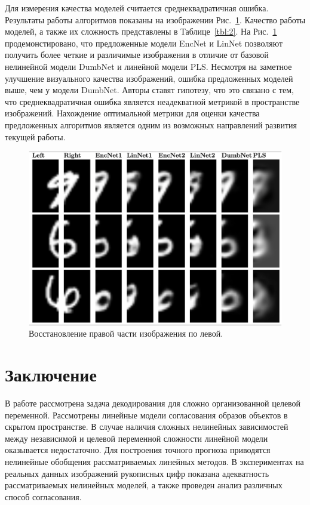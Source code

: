 \documentclass[12pt]{article}
\begin{document}
	Для измерения качества моделей считается среднеквадратичная ошибка. Результаты работы алгоритмов показаны на изображении Рис.~\ref{fgr:2}. Качество работы моделей, а также их сложность представлены в Таблице~\ref{tbl:2}. 
	На Рис.~\ref{fgr:2} продемонстировано, что предложенные модели EncNet и LinNet позволяют получить более четкие и различимые изображения в отличие от базовой нелинейной модели DumbNet и линейной модели PLS.
	Несмотря на заметное улучшение визуального качества изображений, ошибка предложенных моделей выше, чем у модели DumbNet. 
	Авторы ставят гипотезу, что это связано с тем, что среднеквадратичная ошибка является неадекватной метрикой в пространстве изображений.
	Нахождение оптимальной метрики для оценки качества предложенных алгоритмов является одним из возможных направлений развития текущей работы.
	
	\begin{figure}[h!]
		\begin{center}
			\includegraphics[width=\linewidth]{figures/mnist_preds}
		\end{center}
		\caption{Восстановление правой части изображения по левой.}
		\label{fgr:2}
	\end{figure}

	\section{Заключение}
	В работе рассмотрена задача декодирования для сложно организованной целевой переменной.
	Рассмотрены линейные модели согласования образов объектов в скрытом пространстве.
	В случае наличия сложных нелинейных зависимостей между независимой и целевой переменной сложности линейной модели оказывается недостаточно.
	Для построения точного прогноза приводятся нелинейные обобщения рассматриваемых линейных методов.
	В экспериментах на реальных данных изображений рукописных цифр показана адекватность рассматриваемых нелинейных моделей, а также проведен анализ различных способ согласования.
	
\end{document}
